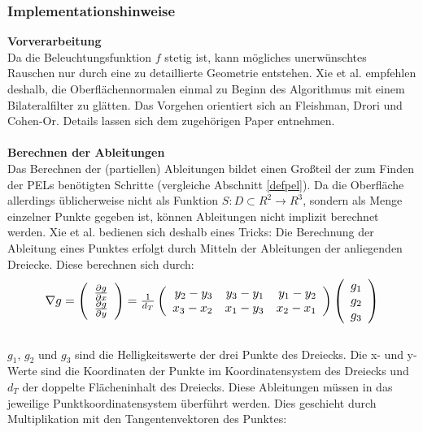 \documentclass{paperStyle}
\begin{document}
\subsubsection{Implementationshinweise}
\label{pel-impl}
\textbf{Vorverarbeitung}\\
Da die Beleuchtungsfunktion $f$ stetig ist, kann mögliches unerwünschtes Rauschen nur durch eine zu detaillierte Geometrie entstehen. Xie et al. empfehlen deshalb, die Oberflächennormalen einmal zu Beginn des Algorithmus mit einem Bilateralfilter zu glätten. Das Vorgehen orientiert sich an Fleishman, Drori und Cohen-Or. Details lassen sich dem zugehörigen Paper \cite{Fleishman} entnehmen.\\\\
\textbf{Berechnen der Ableitungen}\\
Das Berechnen der (partiellen) Ableitungen bildet einen Großteil der zum Finden der PELs benötigten Schritte (vergleiche Abschnitt \ref{defpel}). Da die Oberfläche allerdings üblicherweise nicht als Funktion $S : D \subset R^{2} \longrightarrow R^{3}$, sondern als Menge einzelner Punkte gegeben ist, können Ableitungen nicht implizit berechnet werden. Xie et al. bedienen sich deshalb eines Tricks:
Die Berechnung der Ableitung eines Punktes erfolgt durch Mitteln der Ableitungen der anliegenden Dreiecke. Diese berechnen sich durch:
\begin{equation}
\resizebox{.85\hsize}{!}{$\nabla g = \left(\begin{array}{c}\frac{\partial g}{\partial x} \\ \frac{\partial g}{\partial y}\end{array}\right) = \frac{1}{d_{T}} \left(\begin{array}{rrr}y_{2}-y_{3} & y_{3}-y_{1} & y_{1}-y_{2} \\ x_{3}-x_{2} & x_{1}-y_{3} & x_{2}-x_{1}\end{array}\right) \left(\begin{array}{c}g_{1} \\ g_{2} \\ g_{3}\end{array}\right)$}
\label{eq:derivativepel}
\end{equation}
\\
$g_{1}$, $g_{2}$ und $g_{3}$ sind die Helligkeitswerte der drei Punkte des Dreiecks. Die x- und y-Werte sind die Koordinaten der Punkte im Koordinatensystem des Dreiecks und $d_{T}$ der doppelte Flächeninhalt des Dreiecks. Diese Ableitungen müssen in das jeweilige Punktkoordinatensystem überführt werden. Dies geschieht durch Multiplikation mit den Tangentenvektoren des Punktes:
\end{document}
